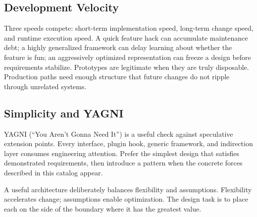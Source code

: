 \documentclass[11pt]{article}
\begin{document}
\subsection{Development Velocity}
Three speeds compete: short-term implementation speed, long-term change speed, and runtime execution speed. A quick feature hack can accumulate maintenance debt; a highly generalized framework can delay learning about whether the feature is fun; an aggressively optimized representation can freeze a design before requirements stabilize. Prototypes are legitimate when they are truly disposable. Production paths need enough structure that future changes do not ripple through unrelated systems.

\subsection{Simplicity and YAGNI}
YAGNI (``You Aren't Gonna Need It'') is a useful check against speculative extension points. Every interface, plugin hook, generic framework, and indirection layer consumes engineering attention. Prefer the simplest design that satisfies demonstrated requirements, then introduce a pattern when the concrete forces described in this catalog appear.

\begin{tradeoff}
A useful architecture deliberately balances flexibility and assumptions. Flexibility accelerates change; assumptions enable optimization. The design task is to place each on the side of the boundary where it has the greatest value.
\end{tradeoff}
\end{document}
